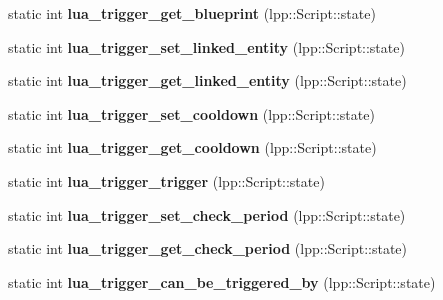 \begin{DoxyCompactItemize}
\item 
static int {\bfseries lua\+\_\+trigger\+\_\+get\+\_\+blueprint} (lpp\+::\+Script\+::state)\hypertarget{class_lua_interface_a92390ca8833f8bb6c8f59e0ba9125b96}{}\label{class_lua_interface_a92390ca8833f8bb6c8f59e0ba9125b96}

\item 
static int {\bfseries lua\+\_\+trigger\+\_\+set\+\_\+linked\+\_\+entity} (lpp\+::\+Script\+::state)\hypertarget{class_lua_interface_a427b6de440d11b7eaad5c7314b7b335d}{}\label{class_lua_interface_a427b6de440d11b7eaad5c7314b7b335d}

\item 
static int {\bfseries lua\+\_\+trigger\+\_\+get\+\_\+linked\+\_\+entity} (lpp\+::\+Script\+::state)\hypertarget{class_lua_interface_ac099cec8a47cc79d26ef223bd7b78f4d}{}\label{class_lua_interface_ac099cec8a47cc79d26ef223bd7b78f4d}

\item 
static int {\bfseries lua\+\_\+trigger\+\_\+set\+\_\+cooldown} (lpp\+::\+Script\+::state)\hypertarget{class_lua_interface_a9a62dd9aa394cd5dbbc08f55e83668ad}{}\label{class_lua_interface_a9a62dd9aa394cd5dbbc08f55e83668ad}

\item 
static int {\bfseries lua\+\_\+trigger\+\_\+get\+\_\+cooldown} (lpp\+::\+Script\+::state)\hypertarget{class_lua_interface_aa174f2f4d91c7d4b90f05507a8931242}{}\label{class_lua_interface_aa174f2f4d91c7d4b90f05507a8931242}

\item 
static int {\bfseries lua\+\_\+trigger\+\_\+trigger} (lpp\+::\+Script\+::state)\hypertarget{class_lua_interface_a178e0b35463bce47ebde917450a76bd1}{}\label{class_lua_interface_a178e0b35463bce47ebde917450a76bd1}

\item 
static int {\bfseries lua\+\_\+trigger\+\_\+set\+\_\+check\+\_\+period} (lpp\+::\+Script\+::state)\hypertarget{class_lua_interface_ac4bb365e6604e45057d0787379a1d95c}{}\label{class_lua_interface_ac4bb365e6604e45057d0787379a1d95c}

\item 
static int {\bfseries lua\+\_\+trigger\+\_\+get\+\_\+check\+\_\+period} (lpp\+::\+Script\+::state)\hypertarget{class_lua_interface_a49dce501a5e47dbfe9ac60f56cba6b6f}{}\label{class_lua_interface_a49dce501a5e47dbfe9ac60f56cba6b6f}

\item 
static int {\bfseries lua\+\_\+trigger\+\_\+can\+\_\+be\+\_\+triggered\+\_\+by} (lpp\+::\+Script\+::state)\hypertarget{class_lua_interface_a71008771b7bde71d6b1f6a66ae09e6b7}{}\label{class_lua_interface_a71008771b7bde71d6b1f6a66ae09e6b7}


\end{DoxyCompactItemize}
